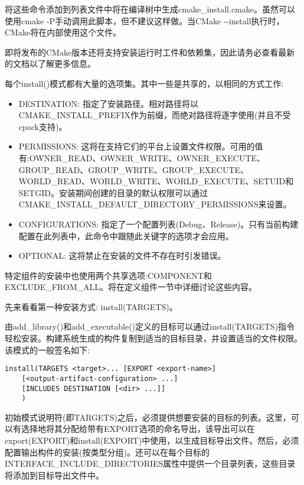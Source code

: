 将这些命令添加到列表文件中将在编译树中生成cmake\_install.cmake。虽然可以使用cmake -P手动调用此脚本，但不建议这样做。当CMake -{}-install执行时，CMake将在内部使用这个文件。

\begin{tcolorbox}[colback=blue!5!white,colframe=blue!75!black,title=Note]
即将发布的CMake版本还将支持安装运行时工件和依赖集，因此请务必查看最新的文档以了解更多信息。
\end{tcolorbox}

每个install()模式都有大量的选项集。其中一些是共享的，以相同的方式工作:

\begin{itemize}
\item 
DESTINATION: 指定了安装路径。相对路径将以CMAKE\_INSTALL\_PREFIX作为前缀，而绝对路径将逐字使用(并且不受cpack支持)。

\item 
PERMISSIONS: 这将在支持它们的平台上设置文件权限。可用的值有:OWNER\_READ、OWNER\_WRITE、OWNER\_EXECUTE、GROUP\_READ、GROUP\_WRITE、GROUP\_EXECUTE、WORLD\_READ、WORLD\_WRITE、WORLD\_EXECUTE、SETUID和SETGID。安装期间创建的目录的默认权限可以通过CMAKE\_INSTALL\_DEFAULT\_DIRECTORY\_PERMISSIONS来设置。

\item 
CONFIGURATIONS: 指定了一个配置列表(Debug、Release)。只有当前构建配置在此列表中，此命令中跟随此关键字的选项才会应用。

\item 
OPTIONAL: 这将禁止在安装的文件不存在时引发错误。
\end{itemize}

特定组件的安装中也使用两个共享选项:COMPONENT和EXCLUDE\_FROM\_ALL。将在定义组件一节中详细讨论这些内容。

先来看看第一种安装方式: install(TARGETS)。


由add\_library()和add\_executable()定义的目标可以通过install(TARGETS)指令轻松安装。构建系统生成的构件复制到适当的目标目录，并设置适当的文件权限。该模式的一般签名如下:

\begin{lstlisting}[style=styleCMake]
install(TARGETS <target>... [EXPORT <export-name>]
	[<output-artifact-configuration> ...]
	[INCLUDES DESTINATION [<dir> ...]]
	)
\end{lstlisting}

初始模式说明符(即TARGETS)之后，必须提供想要安装的目标的列表。这里，可以有选择地将其分配给带有EXPORT选项的命名导出，该导出可以在export(EXPORT)和install(EXPORT)中使用，以生成目标导出文件。然后，必须配置输出构件的安装(按类型分组)。还可以在每个目标的INTERFACE\_INCLUDE\_DIRECTORIES属性中提供一个目录列表，这些目录将添加到目标导出文件中。

